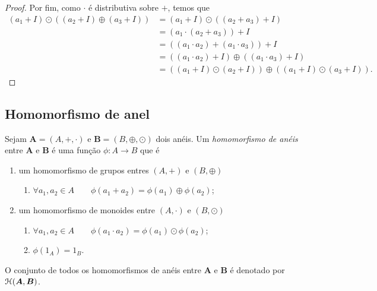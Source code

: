 \begin{proof}
	Por fim, como $\cdot$ é distributiva sobre $+$, temos que
	\begin{align*}
	(a_1+I)\odot((a_2+I)\oplus(a_3+I)) &= (a_1+I)\odot((a_2+a_3)+I) \\
		&= (a_1 \cdot (a_2+a_3))+I \\
		&= ((a_1 \cdot a_2) + (a_1 \cdot a_3))+I \\
		&= ((a_1 \cdot a_2)+I) \oplus ((a_1 \cdot a_3)+I) \\
		&= ((a_1+I)\odot(a_2+I))\oplus((a_1+I)\odot(a_3+I)).
	\end{align*}
\end{proof}

\subsection{Homomorfismo de anel}

\begin{definition}
	Sejam $\bm A=(A,+,\cdot)$ e $\bm B=(B,\oplus,\odot)$ dois anéis. Um \emph{homomorfismo de anéis} entre $\bm A$ e $\bm B$ é uma função $\phi: A \to B$ que é
	\begin{enumerate}
	\item um homomorfismo de grupos entres $(A,+)$ e $(B,\oplus)$
		\begin{enumerate}
		\item $\forall a_1,a_2 \in A \qquad \phi(a_1 + a_2) = \phi(a_1) \oplus \phi(a_2)$;
		\end{enumerate}
	\item um homomorfismo de monoides entre $(A,\cdot)$ e $(B,\odot)$
		\begin{enumerate}
		\item $\forall a_1,a_2 \in A \qquad \phi(a_1 \cdot a_2) = \phi(a_1) \odot \phi(a_2)$;
		\item $\phi(1_A)=1_B$.
		\end{enumerate}
	\end{enumerate}

	O conjunto de todos os homomorfismos de anéis entre $\bm A$ e $\bm B$ é denotado por $\mathcal{H}(\bm A,\bm B)$.
\end{definition}

